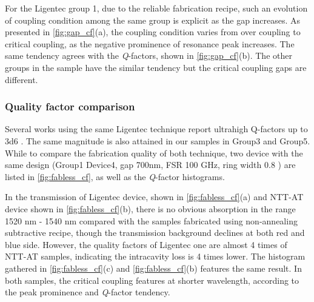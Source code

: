 For the Ligentec group 1, due to the reliable fabrication recipe, such an evolution of coupling condition among the same group is explicit as the gap increases.
As presented in \autoref{fig:gap_cf}(a), the coupling condition varies from over coupling to critical coupling, as the negative prominence of resonance peak increases. The same tendency agrees with the \textit{Q}-factors, shown in \autoref{fig:gap_cf}(b). The other groups in the sample have the similar tendency but the critical coupling gaps are different.

\begin{figure}
	\centering
	
	\label{fig:gap_cf}
\end{figure}

\subsubsection{Quality factor comparison}

Several works using the same Ligentec technique report ultrahigh Q-factors up to \num{3d6} \cites{Yu2019, Vaidya2019}. The same magnitude is also attained in our samples in Group3 and Group5. While to compare the fabrication quality of both technique, two device with the same design (Group1 Device4, gap 700nm, FSR 100 GHz, ring width 0.8 \um ) are listed in \autoref{fig:fabless_cf}, as well as the \textit{Q}-factor histograms.

\begin{figure}
	\centering
	
	\label{fig:fabless_cf}
\end{figure}

In the transmission of Ligentec device, shown in \autoref{fig:fabless_cf}(a)  and NTT-AT device shown in \autoref{fig:fabless_cf}(b), there is no obvious absorption in the range 1520 nm - 1540 nm compared with the samples fabricated using non-annealing subtractive recipe, though the transmission background declines at both red and blue side. However, the quality factors of Ligentec one are almost 4 times of NTT-AT samples, indicating the intracavity loss is 4 times lower. The histogram gathered in \autoref{fig:fabless_cf}(c) and \autoref{fig:fabless_cf}(b) features the same result.
In both samples, the critical coupling features at shorter wavelength, according to the peak prominence and \textit{Q}-factor tendency. 

